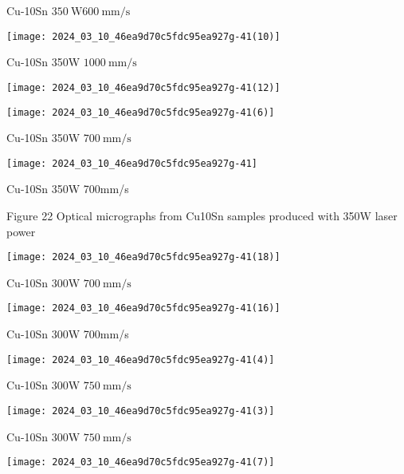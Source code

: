 \documentclass[10pt]{article}
\begin{document}
Cu-10Sn $350 \mathrm{~W} 600 \mathrm{~mm} / \mathrm{s}$

\begin{center}
\texttt{[image: 2024\_03\_10\_46ea9d70c5fdc95ea927g-41(10)]}
\end{center}

Cu-10Sn 350W $1000 \mathrm{~mm} / \mathrm{s}$

\begin{center}
\texttt{[image: 2024\_03\_10\_46ea9d70c5fdc95ea927g-41(12)]}
\end{center}

\begin{center}
\texttt{[image: 2024\_03\_10\_46ea9d70c5fdc95ea927g-41(6)]}
\end{center}

Cu-10Sn 350W $700 \mathrm{~mm} / \mathrm{s}$

\begin{center}
\texttt{[image: 2024\_03\_10\_46ea9d70c5fdc95ea927g-41]}
\end{center}

Cu-10Sn 350W 700mm/s

Figure 22 Optical micrographs from Cu10Sn samples produced with 350W laser power

\begin{center}
\texttt{[image: 2024\_03\_10\_46ea9d70c5fdc95ea927g-41(18)]}
\end{center}

Cu-10Sn 300W $700 \mathrm{~mm} / \mathrm{s}$

\begin{center}
\texttt{[image: 2024\_03\_10\_46ea9d70c5fdc95ea927g-41(16)]}
\end{center}

Cu-10Sn 300W 700mm/s

\begin{center}
\texttt{[image: 2024\_03\_10\_46ea9d70c5fdc95ea927g-41(4)]}
\end{center}

Cu-10Sn 300W $750 \mathrm{~mm} / \mathrm{s}$

\begin{center}
\texttt{[image: 2024\_03\_10\_46ea9d70c5fdc95ea927g-41(3)]}
\end{center}

Cu-10Sn 300W $750 \mathrm{~mm} / \mathrm{s}$

\begin{center}
\texttt{[image: 2024\_03\_10\_46ea9d70c5fdc95ea927g-41(7)]}
\end{center}
\end{document}
